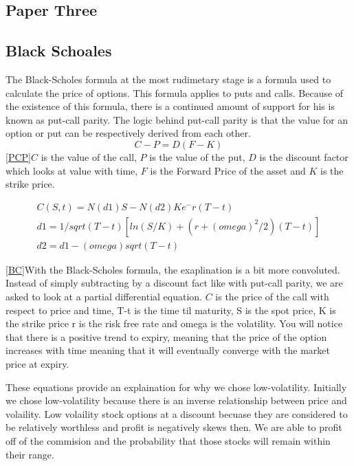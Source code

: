 \documentclass[paper=letter, fontsize=11pt]{scrartcl}
\numberwithin{equation}{section}		%
\numberwithin{figure}{section}			%
\numberwithin{table}{section}				%
\begin{document}
\begin{spacing}{2}
\subsection{Paper Three}


\subsection{Black Schoales}
The Black-Scholes formula at the most rudimetary stage is a formula used to calculate the price of options. This formula applies to puts and calls. Because of the existence of this formula, there is a continued amount of support for his is known as put-call parity. The logic behind put-call parity is that the value for an option or put can be respectively derived from each other. 
\begin{equation}
C-P = D(F-K)
\label{PCP}
\end{equation}
\ref{PCP}$C$ is the value of the call, $P$ is the value of the put, $D$ is the discount factor which looks at value with time, $F$ is the Forward Price of the asset and $K$ is the strike price.
\begin{center}
\begin{align}
\label{BC}
&C(S,t) = N(d1)S-N(d2)Ke^-r(T-t)& \\
&d1=1/sqrt(T-t)[ln(S/K) + (r+(omega)^2/2)(T-t)]&\\
&d2= d1 -(omega)sqrt(T-t)&
\end{align}
\end{center}
\ref{BC}With the Black-Scholes formula, the exaplination is a bit more convoluted. Instead of simply subtracting by a discount fact like with put-call parity, we are asked to look at a partial differential equation. $C$ is the price of the call with respect to price and time, T-t is the time til maturity, S is the spot price, K is the strike price r is the risk free rate and omega is the volatility. You will notice that there is a positive trend to expiry, meaning that the price of the option increases with time meaning that it will eventually converge with the market price at expiry. 

These equations provide an explaination for why we chose low-volatility. Initially we chose low-volatility because there is an inverse relationship between price and volaility. Low volaility stock options at a discount becuase they are considered to be relatively worthless and profit is negatively skews then. We are able to profit off of the commision and the probability that those stocks will remain within their range. 

\end{spacing}
\end{document}
